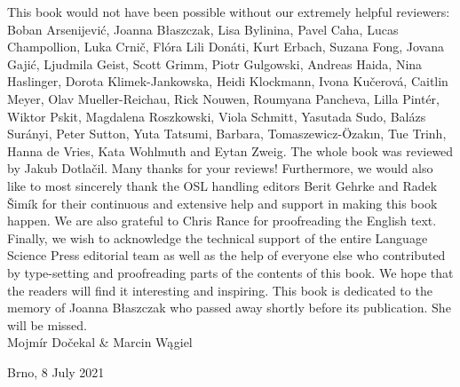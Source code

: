 \documentclass[output=paper]{langscibook}
\begin{document}
This book would not have been possible without our extremely helpful reviewers: Boban Arsenijević, Joanna Błaszczak, Lisa Bylinina, Pavel Caha, Lucas Champollion, Luka Crnič, Flóra Lili Donáti, Kurt Erbach, Suzana Fong, Jovana Gajić, Ljudmila Geist, Scott Grimm, Piotr Gulgowski, Andreas Haida, Nina Haslinger, Dorota Klimek-Jankowska, Heidi Klockmann, Ivona Kučerová, Caitlin Meyer, Olav Mueller-Reichau, Rick Nouwen, Roumyana Pancheva, Lilla Pintér, Wiktor Pskit, Magdalena Roszkowski, Viola Schmitt, Yasutada Sudo, Balázs Surányi, Peter Sutton, Yuta Tatsumi, Barbara, Tomaszewicz-Özakın, Tue Trinh, Hanna de Vries, Kata Wohlmuth and Eytan Zweig. The whole book was reviewed by Jakub Dotlačil. Many thanks for your reviews! Furthermore, we would also like to most sincerely thank the OSL handling editors Berit Gehrke and Radek Šimík for their continuous and extensive help and support in making this book happen. We are also grateful to Chris Rance for proofreading the English text. Finally, we wish to acknowledge the technical support of the entire Language Science Press editorial team as well as the help of everyone else who contributed by type-setting and proofreading parts of the contents of this book. We hope that the readers will find it interesting and inspiring. This book is dedicated to the memory of Joanna Błaszczak who passed away shortly before its publication. She will be missed.\bigskip\\

\hfill Mojmír Dočekal \& Marcin Wągiel

\hfill Brno, 8 July 2021

{\sloppy\printbibliography[heading=subbibliography,notkeyword=this]}
\end{document}
